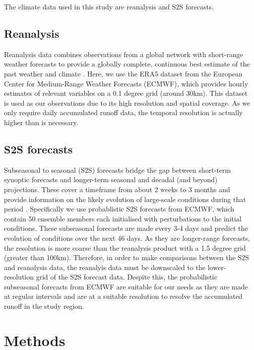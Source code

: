 \documentclass[11pt]{article}
\begin{document}
The climate data used in this study are reanalysis and S2S forecasts.

\subsection*{Reanalysis}


Reanalysis data combines observations from a global network with short-range weather forecasts to provide a globally complete, continuous best estimate of the past weather and climate \parencite{ecmwf:reanalysis}. Here, we use the ERA5 dataset from the European Center for Medium-Range Weather Forecasts (ECMWF), which provides hourly estimates of relevant variables on a 0.1 degree grid (around 30km). This dataset is used as our observations due to its high resolution and spatial coverage. As we only require daily accumulated runoff data, the temporal resolution is actually higher than is necessary. 

\subsection*{S2S forecasts}


Subseasonal to seasonal (S2S) forecasts bridge the gap between short-term synoptic forecasts and longer-term seasonal and decadal (and beyond) projections. These cover a timeframe from about 2 weeks to 3 months and provide information on the likely evolution of large-scale conditions during that period \parencite{s2s:homepage}. Specifically we use probablistic S2S forecasts from ECMWF, which contain 50 ensemble members each initialised with perturbations to the initial conditions. These subseasonal forecasts are made every 3-4 days and predict the evolution of conditions over the next 46 days. As they are longer-range forecasts, the resolution is more coarse than the reanalysis product with a 1.5 degree grid (greater than 100km). Therefore, in order to make comparisons between the S2S and reanalysis data, the reanalyis data must be downscaled to the lower-resolution grid of the S2S forecast data. Despite this, the probabilistic subseasonal forecasts from ECMWF are suitable for our needs as they are made at regular intervals and are at a suitable resolution to resolve the accumulated runoff in the study region.

\section*{Methods}
\end{document}

